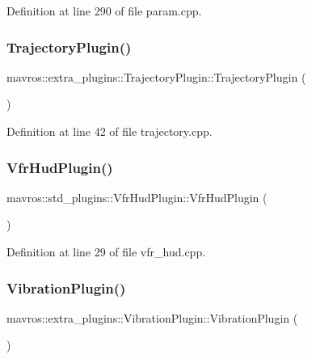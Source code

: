 Definition at line 290 of file param.\+cpp.

\mbox{\label{group__plugin_ga97ea75d091e826ffb7445dd2f4863880}} 
\subsubsection{\texorpdfstring{TrajectoryPlugin()}{TrajectoryPlugin()}}
{\footnotesize\ttfamily mavros\+::extra\+\_\+plugins\+::\+Trajectory\+Plugin\+::\+Trajectory\+Plugin (\begin{DoxyParamCaption}{ }\end{DoxyParamCaption})\hspace{0.3cm}{\ttfamily [inline]}}



Definition at line 42 of file trajectory.\+cpp.

\mbox{\label{group__plugin_ga3657bfeb1a29cd38bf912fa874f7b72b}} 
\subsubsection{\texorpdfstring{VfrHudPlugin()}{VfrHudPlugin()}}
{\footnotesize\ttfamily mavros\+::std\+\_\+plugins\+::\+Vfr\+Hud\+Plugin\+::\+Vfr\+Hud\+Plugin (\begin{DoxyParamCaption}{ }\end{DoxyParamCaption})\hspace{0.3cm}{\ttfamily [inline]}}



Definition at line 29 of file vfr\+\_\+hud.\+cpp.

\mbox{\label{group__plugin_ga53355fa4e5a753bea611c2c7f0ee3cf2}} 
\subsubsection{\texorpdfstring{VibrationPlugin()}{VibrationPlugin()}}
{\footnotesize\ttfamily mavros\+::extra\+\_\+plugins\+::\+Vibration\+Plugin\+::\+Vibration\+Plugin (\begin{DoxyParamCaption}{ }\end{DoxyParamCaption})\hspace{0.3cm}{\ttfamily [inline]}}



